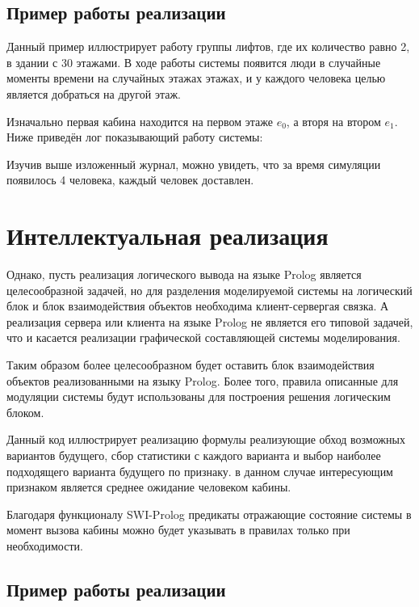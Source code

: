 		\subsection{Пример работы реализации}

	Данный пример иллюстрирует работу группы лифтов, где их количество равно 2, в здании с 30 этажами.
		В ходе работы системы появится люди в случайные моменты времени на случайных этажах этажах,
		и у каждого человека целью является добраться на другой этаж.

	Изначально первая кабина находится на первом этаже $e_0$, а вторя на втором $e_1$.
		Ниже приведён лог показывающий работу системы:

	Изучив выше изложенный журнал, можно увидеть, что за время симуляции появилось 4 человека,
		каждый человек доставлен.

\section{Интеллектуальная реализация}

Однако, пусть реализация логического вывода на языке Prolog является целесообразной задачей, но для разделения моделируемой системы на логический блок и блок взаимодействия объектов необходима клиент-сервергая связка. А реализация сервера или клиента на языке Prolog не является его типовой задачей, что и касается реализации графической составляющей системы моделирования.

	Таким образом более целесообразном будет оставить блок взаимодействия объектов реализованными на языку Prolog.
		Более того, правила описанные для модуляции системы будут использованы
		для построения решения логическим блоком.

	Данный код иллюстрирует реализацию формулы реализующие обход возможных вариантов будущего, сбор статистики с каждого варианта и выбор наиболее подходящего варианта будущего по признаку. в данном случае интересующим признаком является среднее ожидание человеком кабины. 

% 

	Благодаря функционалу SWI-Prolog
		предикаты отражающие состояние системы в момент вызова кабины можно будет указывать в правилах только при необходимости.

		\subsection{Пример работы реализации}


